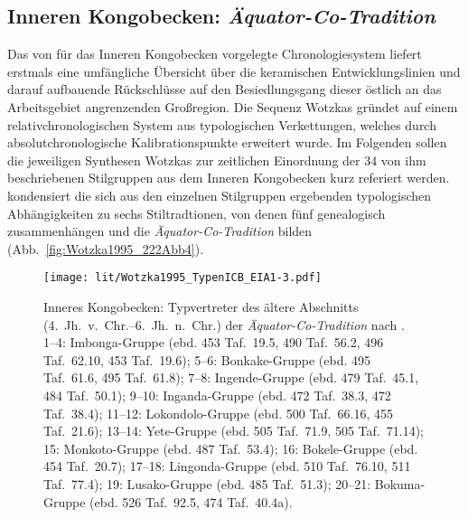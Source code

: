 \subsection{Inneren Kongobecken: \textit{Äquator-Co-Tradition}}\label{sec:ICB_StilGrDatierungen}

Das von \textcite{Wotzka.1995} für das Inneren Kongobecken vorgelegte Chronologiesystem liefert erstmals eine umfängliche Übersicht über die keramischen Entwicklungslinien und darauf aufbauende Rückschlüsse auf den Besiedlungsgang dieser östlich an das Arbeitsgebiet angrenzenden Großregion. Die Sequenz Wotzkas gründet auf einem relativchronologischen System aus typologischen Verkettungen, welches durch absolutchronologische Kalibrationspunkte erweitert wurde. Im Folgenden sollen die jeweiligen Synthesen Wotzkas zur zeitlichen Einordnung der 34 von ihm beschriebenen Stilgruppen aus dem Inneren Kongobecken kurz referiert werden. \textcite[]{Wotzka.1995} kondensiert die sich aus den einzelnen Stilgruppen ergebenden typologischen Abhängigkeiten zu sechs Stiltradtionen, von denen fünf genealogisch zusammenhängen und die \textit{Äquator-Co-Tradition} bilden (Abb.~\ref{fig:Wotzka1995_222Abb4}).

\begin{figure*}[p]
\centering
\texttt{[image: lit/Wotzka1995\_TypenICB\_EIA1-3.pdf]}
\caption{Inneres Kongobecken: Typvertreter des ältere Abschnitts (4.~Jh.~v.~Chr.--6.~Jh.~n.~Chr.)  der \textit{Äquator-Co-Tradition} nach \textcite{Wotzka.1995}.\\{\footnotesize 1--4: Imbonga-Gruppe (ebd. 453 Taf.~19.5, 490 Taf.~56.2, 496 Taf.~62.10, 453 Taf.~19.6); 5--6: Bonkake-Gruppe (ebd. 495 Taf.~61.6, 495 Taf.~61.8); 7--8: Ingende-Gruppe (ebd. 479 Taf.~45.1, 484 Taf.~50.1); 9--10: Inganda-Gruppe (ebd. 472 Taf.~38.3, 472 Taf.~38.4); 11--12: Lokondolo-Gruppe (ebd. 500 Taf.~66.16, 455 Taf.~21.6); 13--14: Yete-Gruppe (ebd. 505 Taf.~71.9, 505 Taf.~71.14); 15: Monkoto-Gruppe (ebd. 487 Taf.~53.4); 16: Bokele-Gruppe (ebd. 454 Taf.~20.7); 17--18: Lingonda-Gruppe (ebd. 510 Taf.~76.10, 511 Taf.~77.4); 19: Lusako-Gruppe (ebd. 485 Taf.~51.3); 20--21: Bokuma-Gruppe (ebd. 526 Taf.~92.5, 474 Taf.~40.4a).}}
\label{fig:Wotzka1995_TypenICB_EIA1}
\end{figure*}

